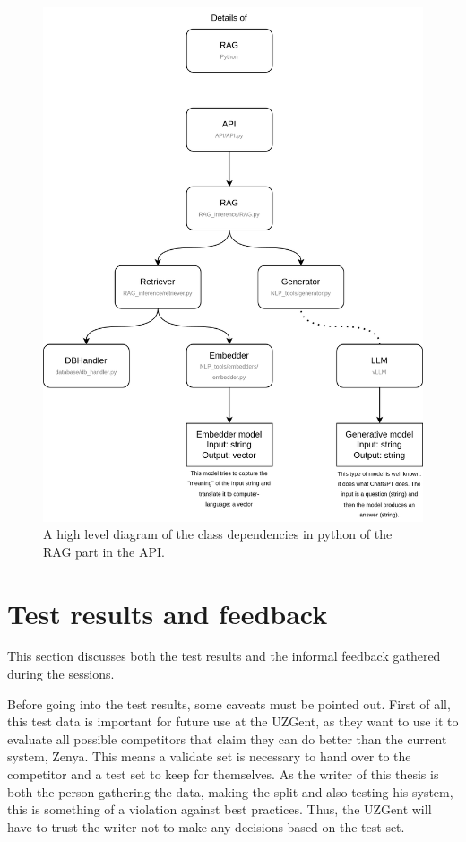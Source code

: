 \begin{figure}[H]
    \captionsetup{justification=centering}
    \centerline{\includegraphics[width=1\linewidth]{fig/Architecture Python.png}}
    \caption{A high level diagram of the class dependencies in python of the RAG part in the API.}
    \label{fig:architecture_python}
\end{figure}

\section{Test results and feedback}
This section discusses both the test results and the informal feedback gathered during the sessions.

Before going into the test results, some caveats must be pointed out. First of all, this test data is important for future use at the UZGent, as they want to use it to evaluate all possible competitors that claim they can do better than the current system, Zenya. This means a validate set is necessary to hand over to the competitor and a test set to keep for themselves. As the writer of this thesis is both the person gathering the data, making the split and also testing his system, this is something of a violation against best practices. Thus, the UZGent will have to trust the writer not to make any decisions based on the test set.

